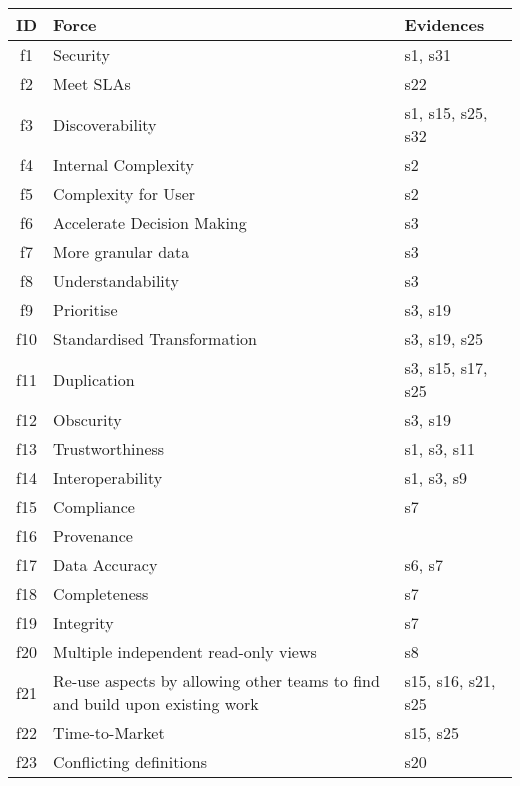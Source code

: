 \begin{tabular}{|c|p{}|p{}|}
\hline
{\bf ID} & {\bf Force} & {\bf Evidences}\\
\hline
f1 & Security & \cellcolor{emerald_shape_1} {s1, s31}\\
f2 & Meet SLAs & \cellcolor{emerald_shape_1} {s22}\\
f3 & Discoverability & \cellcolor{emerald_shape_2} {s1, s15, s25, s32}\\
f4 & Internal Complexity & \cellcolor{emerald_shape_1} {s2}\\
f5 & Complexity for User & \cellcolor{emerald_shape_1} {s2}\\
f6 & Accelerate Decision Making & \cellcolor{emerald_shape_1} {s3}\\
f7 & More granular data & \cellcolor{emerald_shape_1} {s3}\\
f8 & Understandability & \cellcolor{emerald_shape_1} {s3}\\
f9 & Prioritise & \cellcolor{emerald_shape_1} {s3, s19}\\
f10 & Standardised Transformation & \cellcolor{emerald_shape_2} {s3, s19, s25}\\
f11 & Duplication & \cellcolor{emerald_shape_2} {s3, s15, s17, s25}\\
f12 & Obscurity & \cellcolor{emerald_shape_1} {s3, s19}\\
f13 & Trustworthiness & \cellcolor{emerald_shape_2} {s1, s3, s11}\\
f14 & Interoperability & \cellcolor{emerald_shape_2} {s1, s3, s9}\\
f15 & Compliance & \cellcolor{emerald_shape_1} {s7}\\
f16 & Provenance & \cellcolor{emerald_shape_1} {}\\
f17 & Data Accuracy & \cellcolor{emerald_shape_1} {s6, s7}\\
f18 & Completeness & \cellcolor{emerald_shape_1} {s7}\\
f19 & Integrity & \cellcolor{emerald_shape_1} {s7}\\
f20 & Multiple independent read-only views & \cellcolor{emerald_shape_1} {s8}\\
f21 & Re-use aspects by allowing other teams to find and build upon existing work & \cellcolor{emerald_shape_2} {s15, s16, s21, s25}\\
f22 & Time-to-Market & \cellcolor{emerald_shape_1} {s15, s25}\\
f23 & Conflicting definitions & \cellcolor{emerald_shape_1} {s20}\\

\end{tabular}

